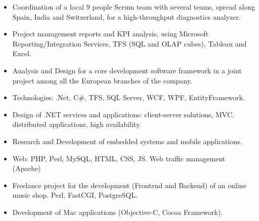 \documentclass[10pt,a4paper]{altacv}
\begin{document}
\begin{itemize}
	\item Coordination of a local 9 people Scrum team with several teams, spread along Spain, India and Switzerland, for a high-throughput diagnostics analyzer.
	\item Project management reports and KPI analysis, using Microsoft Reporting/Integration Services, TFS (SQL and OLAP cubes), Tableau and Excel.
\end{itemize}

\divider

\begin{itemize}
	\item Analysis and Design for a core development software framework in a joint project among all the European branches of the company.
	\item Technologies: .Net, C\#, TFS, SQL Server, WCF, WPF, EntityFramework.
\end{itemize}


\divider

\begin{itemize}
	\item Design of .NET services and applications: client-server solutions, MVC, distributed applications, high availability. 
	\item Research and Development of embedded systems and mobile applications.
\end{itemize}

\divider

\begin{itemize}
	\item Web: PHP, Perl, MySQL, HTML, CSS, JS. Web traffic management (Apache)
\end{itemize}



\begin{itemize}
	\item Freelance project for the development (Frontend and Backend) of an online music shop. Perl, FastCGI, PostgreSQL.
	\item Development of Mac applications (Objective-C, Cocoa Framework).
\end{itemize}
\end{document}
